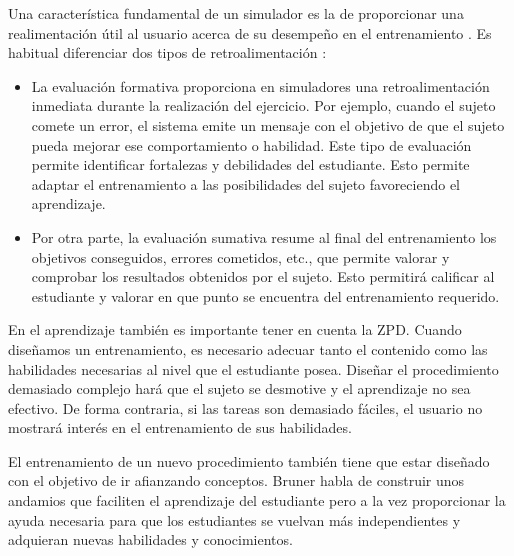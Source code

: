 Una característica fundamental de un simulador es la de proporcionar una realimentación útil al usuario acerca de su desempeño en el entrenamiento \cite{ericsson1993role}. Es habitual diferenciar dos tipos de retroalimentación \cite{Sando2013}: 
\begin{itemize}
    \item La evaluación formativa proporciona en simuladores una retroalimentación inmediata durante la realización del ejercicio. Por ejemplo, cuando el sujeto comete un error, el sistema emite un mensaje con el objetivo de que el sujeto pueda mejorar ese comportamiento o habilidad. Este tipo de evaluación permite identificar fortalezas y debilidades del estudiante. Esto permite adaptar el entrenamiento a las posibilidades del sujeto favoreciendo el aprendizaje.
    \item Por otra parte, la evaluación sumativa resume al final del entrenamiento los objetivos conseguidos, errores cometidos, etc.,  que permite valorar y comprobar los resultados obtenidos por el sujeto. Esto permitirá calificar al estudiante y valorar en que punto se encuentra del entrenamiento requerido.
\end{itemize}


En el aprendizaje también es importante tener en cuenta la \ac{ZPD}\cite{zpd}. Cuando diseñamos un entrenamiento, es necesario adecuar tanto el contenido como las habilidades necesarias al nivel que el estudiante posea. Diseñar el procedimiento demasiado complejo hará que el sujeto se desmotive y el aprendizaje no sea efectivo. De forma contraria, si las tareas son demasiado fáciles, el usuario no mostrará interés en el entrenamiento de sus habilidades.


El entrenamiento de un nuevo procedimiento también tiene que estar diseñado con el objetivo de ir afianzando conceptos. Bruner\cite{olson2014jerome} habla de construir unos andamios que faciliten el aprendizaje del estudiante pero a la vez proporcionar la ayuda necesaria para que los estudiantes se vuelvan más independientes y adquieran nuevas habilidades y conocimientos.



